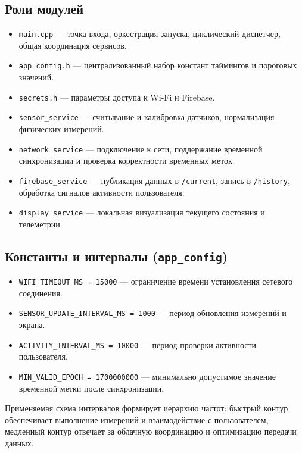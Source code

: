 \subsection{Роли модулей}

\begin{itemize}
    \item \texttt{main.cpp} --- точка входа, оркестрация запуска, циклический диспетчер, общая координация сервисов.
    \item \texttt{app\_config.h} --- централизованный набор констант таймингов и пороговых значений.
    \item \texttt{secrets.h} --- параметры доступа к Wi-Fi и Firebase.
    \item \texttt{sensor\_service} --- считывание и калибровка датчиков, нормализация физических измерений.
    \item \texttt{network\_service} --- подключение к сети, поддержание временной синхронизации и проверка корректности временных меток.
    \item \texttt{firebase\_service} --- публикация данных в \texttt{/current}, запись в \texttt{/history}, обработка сигналов активности пользователя.
    \item \texttt{display\_service} --- локальная визуализация текущего состояния и телеметрии.
\end{itemize}

\subsection{Константы и интервалы (\texttt{app\_config})}

\begin{itemize}
    \item \texttt{WIFI\_TIMEOUT\_MS = 15000} --- ограничение времени установления сетевого соединения.
    \item \texttt{SENSOR\_UPDATE\_INTERVAL\_MS = 1000} --- период обновления измерений и экрана.
    \item \texttt{ACTIVITY\_INTERVAL\_MS = 10000} --- период проверки активности пользователя.
    \item \texttt{MIN\_VALID\_EPOCH = 1700000000} --- минимально допустимое значение временной метки после синхронизации.
\end{itemize}

Применяемая схема интервалов формирует иерархию частот: быстрый контур обеспечивает выполнение измерений и взаимодействие с пользователем, медленный контур отвечает за облачную координацию и оптимизацию передачи данных.

